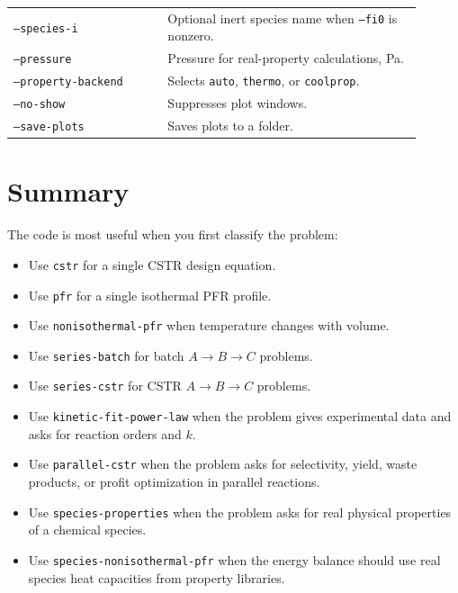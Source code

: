 \documentclass[11pt]{article}
\begin{document}
\begin{center}
\begin{tabular}{p{0.34\linewidth} p{0.56\linewidth}}
\texttt{--species-i} & Optional inert species name when \texttt{--fi0} is nonzero. \\
\texttt{--pressure} & Pressure for real-property calculations, Pa. \\
\texttt{--property-backend} & Selects \texttt{auto}, \texttt{thermo}, or \texttt{coolprop}. \\
\texttt{--no-show} & Suppresses plot windows. \\
\texttt{--save-plots} & Saves plots to a folder. \\
\bottomrule
\end{tabular}
\end{center}

\section{Summary}

The code is most useful when you first classify the problem:

\begin{itemize}
    \item Use \texttt{cstr} for a single CSTR design equation.
    \item Use \texttt{pfr} for a single isothermal PFR profile.
    \item Use \texttt{nonisothermal-pfr} when temperature changes with volume.
    \item Use \texttt{series-batch} for batch $A\to B\to C$ problems.
    \item Use \texttt{series-cstr} for CSTR $A\to B\to C$ problems.
    \item Use \texttt{kinetic-fit-power-law} when the problem gives experimental data and asks for reaction orders and $k$.
    \item Use \texttt{parallel-cstr} when the problem asks for selectivity, yield, waste products, or profit optimization in parallel reactions.
    \item Use \texttt{species-properties} when the problem asks for real physical properties of a chemical species.
    \item Use \texttt{species-nonisothermal-pfr} when the energy balance should use real species heat capacities from property libraries.
\end{itemize}
\end{document}
